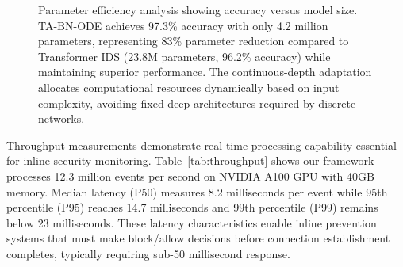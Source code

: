 \documentclass[10pt,journal,compsoc]{IEEEtran}
\begin{document}
\begin{figure}[!t]
\centering
{}
\vspace{-0.3cm}
\caption{Parameter efficiency analysis showing accuracy versus model size. TA-BN-ODE achieves 97.3\% accuracy with only 4.2 million parameters, representing 83\% parameter reduction compared to Transformer IDS (23.8M parameters, 96.2\% accuracy) while maintaining superior performance. The continuous-depth adaptation allocates computational resources dynamically based on input complexity, avoiding fixed deep architectures required by discrete networks.}
\label{fig:parameter_efficiency}
\end{figure}


Throughput measurements demonstrate real-time processing capability essential for inline security monitoring. Table~\ref{tab:throughput} shows our framework processes 12.3 million events per second on NVIDIA A100 GPU with 40GB memory. Median latency (P50) measures 8.2 milliseconds per event while 95th percentile (P95) reaches 14.7 milliseconds and 99th percentile (P99) remains below 23 milliseconds. These latency characteristics enable inline prevention systems that must make block/allow decisions before connection establishment completes, typically requiring sub-50 millisecond response.
\end{document}
